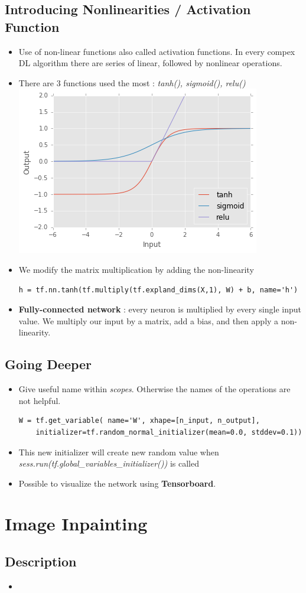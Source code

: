 \documentclass[12pt,a4paper]{article}
\begin{document}
\subsection{Introducing Nonlinearities / Activation Function}
\begin{itemize}
\item Use of non-linear functions also called activation functions. In every compex DL algorithm there are series of linear, followed by nonlinear operations.
\item There are 3 functions used the most : \textit{tanh(), sigmoid(), relu()}\\
\includegraphics[scale=0.5]{nonLinearities}
\item We modify the matrix multiplication by adding the non-linearity
\begin{lstlisting}
h = tf.nn.tanh(tf.multiply(tf.expland_dims(X,1), W) + b, name='h')
\end{lstlisting}
\item \textbf{Fully-connected network} : every neuron is multiplied by every single input value. We multiply our input by a matrix, add a bias, and then apply a non-linearity.
\end{itemize}
\subsection{Going Deeper}
\begin{itemize}
\item Give useful name within \textit{scopes}. Otherwise the names of the operations are not helpful.
\begin{lstlisting}
W = tf.get_variable( name='W', xhape=[n_input, n_output],
    initializer=tf.random_normal_initializer(mean=0.0, stddev=0.1))
\end{lstlisting}
\item This new initializer will create new random value when\\
\textit{sess.run(tf.global\_variables\_initializer())} is called
\item Possible to visualize the network using \textbf{Tensorboard}.
\end{itemize}

\section{Image Inpainting}
\subsection{Description}
\begin{itemize}
\item 
\end{itemize}
\end{document}
